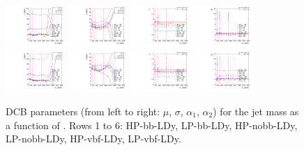 \begin{figure}[htbp]
  \includegraphics[width=0.2\textwidth]{fig/analysisAppendix/paramSignalShape_allSig_MJJ_HP_vbf_LDy_mean.pdf}
  \includegraphics[width=0.2\textwidth]{fig/analysisAppendix/paramSignalShape_allSig_MJJ_HP_vbf_LDy_sigma.pdf}
  \includegraphics[width=0.2\textwidth]{fig/analysisAppendix/paramSignalShape_allSig_MJJ_HP_vbf_LDy_alpha.pdf}
  \includegraphics[width=0.2\textwidth]{fig/analysisAppendix/paramSignalShape_allSig_MJJ_HP_vbf_LDy_alpha2.pdf}\\
  \includegraphics[width=0.2\textwidth]{fig/analysisAppendix/paramSignalShape_allSig_MJJ_LP_vbf_LDy_mean.pdf}
  \includegraphics[width=0.2\textwidth]{fig/analysisAppendix/paramSignalShape_allSig_MJJ_LP_vbf_LDy_sigma.pdf}
  \includegraphics[width=0.2\textwidth]{fig/analysisAppendix/paramSignalShape_allSig_MJJ_LP_vbf_LDy_alpha.pdf}
  \includegraphics[width=0.2\textwidth]{fig/analysisAppendix/paramSignalShape_allSig_MJJ_LP_vbf_LDy_alpha2.pdf}\\
  \caption{
    DCB parameters (from left to right: $\mu$, $\sigma$, $\alpha_1$, $\alpha_2$) for the jet mass \MJ as a function of \MX.
    Rows 1 to 6: HP-bb-LDy, LP-bb-LDy, HP-nobb-LDy, LP-nobb-LDy, HP-vbf-LDy, LP-vbf-LDy.
  }
  \label{fig:MJJShapeParam_LDy}
\end{figure}

